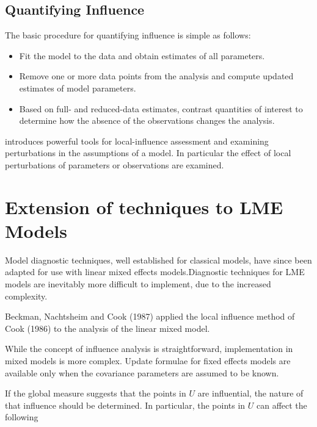 \documentclass[Main.tex]{subfiles}
\begin{document}
\subsection{Quantifying Influence}  %


The basic procedure for quantifying influence is simple as follows:


\begin{itemize}
\item Fit the model to the data and obtain estimates of all parameters.
\item Remove one or more data points from the analysis and compute updated estimates of model parameters.
\item Based on full- and reduced-data estimates, contrast quantities of interest to determine how the absence of the observations changes the analysis.
\end{itemize}


\citet{cook86} introduces powerful tools for local-influence assessment and examining perturbations in the assumptions of a model. In particular the effect of local perturbations of parameters or observations are examined.




\newpage
\section{Extension of techniques to LME Models} %


Model diagnostic techniques, well established for classical models, have since been adapted for use with linear mixed effects models.Diagnostic techniques for LME models are inevitably more difficult to implement, due to the increased complexity.


Beckman, Nachtsheim and Cook (1987) \citet{Beckman} applied the local influence method of Cook (1986) to the analysis of the linear mixed model.


While the concept of influence analysis is straightforward, implementation in mixed models is more complex. Update formulae for fixed effects models are available only when the covariance parameters are assumed to be known.


If the global measure suggests that the points in $U$ are influential, the nature of that influence should be determined. In particular, the points in $U$ can affect the following
\end{document}
